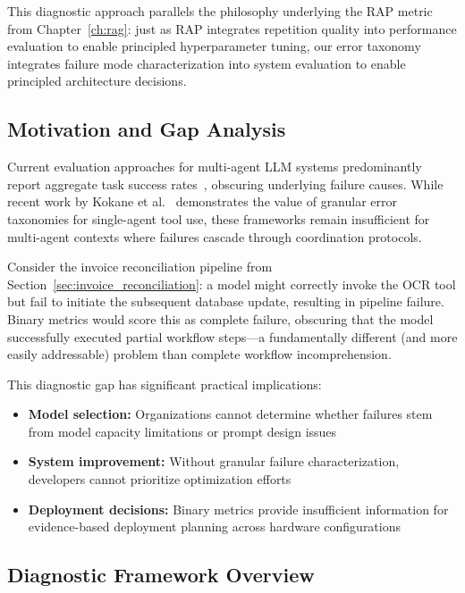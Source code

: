 This diagnostic approach parallels the philosophy underlying the RAP metric from Chapter~\ref{ch:rag}: just as RAP integrates repetition quality into performance evaluation to enable principled hyperparameter tuning, our error taxonomy integrates failure mode characterization into system evaluation to enable principled architecture decisions.

\subsection{Motivation and Gap Analysis}

Current evaluation approaches for multi-agent LLM systems predominantly report aggregate task success rates~\cite{hendrycks2021measuring,zheng2024judging}, obscuring underlying failure causes. While recent work by Kokane et al.~\cite{kokane2024spectool} demonstrates the value of granular error taxonomies for single-agent tool use, these frameworks remain insufficient for multi-agent contexts where failures cascade through coordination protocols.

Consider the invoice reconciliation pipeline from Section~\ref{sec:invoice_reconciliation}: a model might correctly invoke the OCR tool but fail to initiate the subsequent database update, resulting in pipeline failure. Binary metrics would score this as complete failure, obscuring that the model successfully executed partial workflow steps---a fundamentally different (and more easily addressable) problem than complete workflow incomprehension.

This diagnostic gap has significant practical implications:
\begin{itemize}[leftmargin=*]
    \item \textbf{Model selection:} Organizations cannot determine whether failures stem from model capacity limitations or prompt design issues
    \item \textbf{System improvement:} Without granular failure characterization, developers cannot prioritize optimization efforts
    \item \textbf{Deployment decisions:} Binary metrics provide insufficient information for evidence-based deployment planning across hardware configurations
\end{itemize}

\subsection{Diagnostic Framework Overview}

